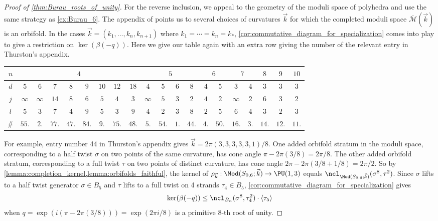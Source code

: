 \documentclass{amsart}
\begin{document}
\begin{proof}[Proof of \cref{thm:Burau_roots_of_unity}]
        For the reverse inclusion, we appeal to the geometry of the moduli space of polyhedra and use the same strategy as \cref{ex:Burau_6}. The appendix of \cite{Thurston1998ShapesSphere} points us to several choices of curvatures $\vec k$ for which the completed moduli space $\overline{\mathcal M}(\vec k)$ is an orbifold. In the cases $\vec k = (k_1,\dotsc,k_n,k_{n+1})$ where $k_1=\dotsb=k_n=k_*$, \cref{cor:commutative_diagram_for_specialization} comes into play to give a restriction on $\ker(\beta(-q))$. Here we give our table again with an extra row giving the number of the relevant entry in Thurston's appendix.
        \begin{center}\begin{tabular}{c||cccccccc|cccc|cc|cc|c|c|c}
                $n$ & \multicolumn{8}{c|}{$4$}                                    & \multicolumn{4}{c|}{$5$}          & \multicolumn{2}{c|}{$6$} & \multicolumn{2}{c|}{$7$}  & $8$ & $9$ & $10$ \\ \hline
                $d$ & $5$ & $6$ & $7$ & $8$ & $9$ & $10$ & $12$ & $18$ & $4$ & $5$ & $6$ & $8$ & $4$ & $5$ & $3$ & $4$ & $3$ & $3$ & $3$  \\
                $j$ & $\infty$ & $\infty$ & $14$ & $8$ & $6$ & $5$  & $4$  & $3$  & $\infty$ & $5$ & $3$ & $2$ & $4$  & $2$ & $\infty$ & $2$ & $6$ & $3$ & $2$  \\
                $l$ & $5$ & $3$ & $7$ & $4$ & $9$ & $5$ & $3$ & $9$ & $4$ & $2$ & $3$ & $8$ & $2$ & $5$ & $6$ & $4$ & $3$ & $2$ & $3$ \\ \hline
                \# & $55.$ & $2.$ & $77.$ & $47.$ & $84.$ & $9.$ & $75.$ & $48.$ & $5.$ & $54.$ & $1.$ & $44.$ & $4.$ & $50.$ & $16.$ & $3.$ & $14.$ & $12.$ & $11.$
        \end{tabular}\end{center}

        For example, entry number 44 in Thurston's appendix gives $\vec k = 2\pi(3,3,3,3,3,1)/8$. One added orbifold stratum in the moduli space, corresponding to a half twist $\sigma$ on two points of the same curvature, has cone angle $\pi-2\pi(3/8) = 2\pi/8$. The other added orbifold stratum, corresponding to a full twist $\tau$ on two points of distinct curvature, has cone angle $2\pi-2\pi(3/8+1/8) = 2\pi/2$. So by \cref{lemma:completion_kernel,lemma:orbifolds_faithful}, the kernel of $\rho_{\vec k}:\Mod(S_{0,6};\vec k) \to \PU(1,3)$ equals $\ncl_{\Mod(S_{0,6};\vec k)}(\sigma^8, \tau^2)$. Since $\sigma$ lifts to a half twist generator $\sigma \in B_5$ and $\tau$ lifts to a full twist on 4 strands $\tau_4 \in B_5$, \cref{cor:commutative_diagram_for_specialization} gives
        \begin{equation*}
            \ker (\beta(-q)) \leq \ncl_{B_n}(\sigma^8,\tau_4^2) \cdot \langle \tau_5 \rangle
        \end{equation*}
        when $q=\exp(i(\pi-2\pi(3/8))) = \exp(2\pi i/8)$ is a primitive 8-th root of unity.
        

\end{proof}
\end{document}
